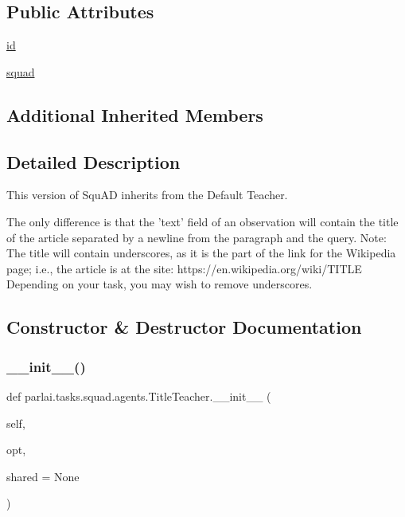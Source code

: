 \subsection*{Public Attributes}
\begin{DoxyCompactItemize}
\item 
\hyperlink{classparlai_1_1tasks_1_1squad_1_1agents_1_1TitleTeacher_afc29efc5cf9c9800f0cb5d9346b48f61}{id}
\item 
\hyperlink{classparlai_1_1tasks_1_1squad_1_1agents_1_1TitleTeacher_a416d2c1d7eb4e93ba1dc213cba6d2d26}{squad}
\end{DoxyCompactItemize}
\subsection*{Additional Inherited Members}


\subsection{Detailed Description}
\begin{DoxyVerb}This version of SquAD inherits from the Default Teacher.

The only
difference is that the 'text' field of an observation will contain
the title of the article separated by a newline from the paragraph and the
query.
Note: The title will contain underscores, as it is the part of the link for
the Wikipedia page; i.e., the article is at the site:
https://en.wikipedia.org/wiki/{TITLE}
Depending on your task, you may wish to remove underscores.
\end{DoxyVerb}
 

\subsection{Constructor \& Destructor Documentation}
\mbox{\label{classparlai_1_1tasks_1_1squad_1_1agents_1_1TitleTeacher_a3d00faef86db6eb5b783b4aba4216daa}} 
\subsubsection{\texorpdfstring{\+\_\+\+\_\+init\+\_\+\+\_\+()}{\_\_init\_\_()}}
{\footnotesize\ttfamily def parlai.\+tasks.\+squad.\+agents.\+Title\+Teacher.\+\_\+\+\_\+init\+\_\+\+\_\+ (\begin{DoxyParamCaption}\item[{}]{self,  }\item[{}]{opt,  }\item[{}]{shared = {\ttfamily None} }\end{DoxyParamCaption})}



